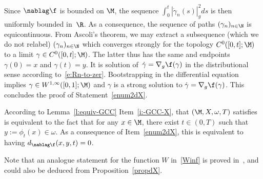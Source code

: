 Since $\nablag\f$ is bounded on $\M$, the sequence $\int_0^t |\dot{\gamma}_n(s)|_g^2ds$ is then uniformly bounded in~$\R$. As a consequence, the sequence of paths $(\gamma_n)_{n\in \N}$ is equicontinuous. From Ascoli's theorem, we may extract a subsequence (which we do not relabel) $(\gamma_n)_{n\in \N}$ which converges strongly for the topology $C^0([0,t]; \M)$ to a limit $\gamma \in C^0([0,t]; \M)$. The latter thus has the same and endpoints $\gamma(0)=x$ and $\gamma(t)=y$. It is solution of~$\dot{\gamma}=\nabla_g \f (\gamma)$ in the distributional sense according to~\eqref{e:Rn-to-zer}. Bootstrapping in the differential equation implies $\gamma \in W^{1,\infty}([0,1];\M)$ and $\gamma$ is a strong solution to $\dot{\gamma}=\nabla_g \f (\gamma)$. This concludes the proof of Statement~\ref{enum2dX}.

According to Lemma~\ref{l:equiv-GCC} Item~\eqref{i:-GCC-X}, that $(\M,X,\omega,T)$ satisfies \pGCC is equivalent to the fact that for any $x\in \M$, there exist $t\in (0,T)$ such that $y:= \phi_t(x)\in \omega$. As a consequence of Item~\eqref{enum2dX}, this is equivalent to having $d_{\nablag \f}(x,y,t)=0$.
\enp

Note that an analogue statement for the function $W$ in~\eqref{Winf} is proved in~\cite[Lem.\,A2.2]{HS:85}, and could also be deduced from Proposition~\ref{propdX}.

